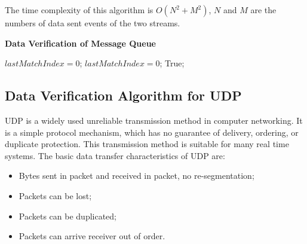 \documentclass[12pt,oneside]{book}
\providecommand{\DIFdelbegin}{} %
\providecommand{\DIFdelend}{} %
\newcommand{\DIFscaledelfig}{0.5}
\newlength{\DIFdelgraphicswidth} %
\newlength{\DIFdelgraphicsheight} %
\newcommand{\DIFdelincludegraphics}[2][]{%
\sbox{\DIFdelgraphicsbox}{\DIFOincludegraphics[#1]{#2}}%
\settoboxwidth{\DIFdelgraphicswidth}{\DIFdelgraphicsbox} %
\settoboxtotalheight{\DIFdelgraphicsheight}{\DIFdelgraphicsbox} %
\scalebox{\DIFscaledelfig}{%
\parbox[b]{\DIFdelgraphicswidth}{\usebox{\DIFdelgraphicsbox}\\[-\baselineskip] \rule{\DIFdelgraphicswidth}{0em}}\llap{\resizebox{\DIFdelgraphicswidth}{\DIFdelgraphicsheight}{%
\setlength{\unitlength}{\DIFdelgraphicswidth}%
\begin{picture}(1,1)%
\thicklines\linethickness{2pt} %
{\color[rgb]{1,0,0}\put(0,0){\framebox(1,1){}}}%
{\color[rgb]{1,0,0}\put(0,0){\line( 1,1){1}}}%
{\color[rgb]{1,0,0}\put(0,1){\line(1,-1){1}}}%
\end{picture}%
}\hspace*{3pt}}} %
} %
\DeclareRobustCommand{\DIFdelbegin}{\DIFOdelbegin \let\includegraphics\DIFdelincludegraphics} %
\DeclareRobustCommand{\DIFdelend}{\DIFOaddend \let\includegraphics\DIFOincludegraphics} %
\begin{document}
The time complexity of this algorithm is $O(N^2+M^2)$, $N$ and $M$ are the numbers of data sent events of the two streams.
\DIFdelbegin %

\DIFdelend 
\begin{algorithm}[H]
\DontPrintSemicolon
\caption{{\bf Data Verification of Message Queue } \label{dataAlg3}}
\;
$lastMatchIndex = 0$;\;
$lastMatchIndex = 0$;\;
 \KwRet True;\;
\end{algorithm} 

\subsection{Data Verification Algorithm for UDP}
UDP is a widely used unreliable transmission method in computer networking. It is a simple protocol mechanism, which has no guarantee of delivery, ordering, or duplicate protection. This transmission method is suitable for many real time systems. The basic data transfer characteristics of UDP are:
\begin{itemize}
  \item Bytes sent in packet and received in packet, no re-segmentation;
  \item Packets can be lost;
  \item Packets can be duplicated;
  \item Packets can arrive receiver out of order.
\end{itemize}
\end{document}
